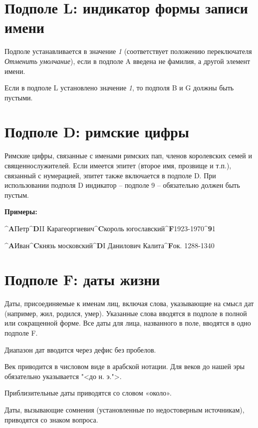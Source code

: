 \section{Подполе L: индикатор формы записи имени}

Подполе устанавливается в значение \emph{1} (соответствует положению переключателя \emph{Отменить умолчание}), если в подполе A введена не фамилия, а другой элемент имени.

Если в подполе L установлено значение \emph{1}, то подполя B и G должны быть пустыми.

\section{Подполе D: римские цифры}

Римские цифры, связанные с именами римских пап, членов королевских семей и священнослужителей. Если имеется эпитет (второе имя, прозвище и т.п.), связанный с нумерацией, эпитет также включается в подполе D. При использовании подполя D индикатор -- подполе 9 -- обязательно должен быть пустым.

\textbf{Примеры:}

\begin{cutelist}
    \item \textbf{\^{}A}Петр\textbf{\^{}D}II Карагеоргиевич\textbf{\^{}C}король югославский\textbf{\^{}F}1923-1970\textbf{\^{}9}1
    \item \textbf{\^{}A}Иван\textbf{\^{}C}князь московский\textbf{\^{}D}I Данилович Калита\textbf{\^{}F}ок. 1288-1340
\end{cutelist}

\section{Подполе F: даты жизни}

Даты, присоединяемые к именам лиц, включая слова, указывающие на смысл дат (например, жил, родился, умер). Указанные слова вводятся в подполе в полной или сокращенной форме. Все даты для лица, названного в поле, вводятся в одно подполе F.

Диапазон дат вводится через дефис без пробелов.

Век приводится в числовом виде в арабской нотации. Для веков до нашей эры обязательно указывается "<до н. э.">.

Приблизительные даты приводятся со словом «около».

Даты, вызывающие сомнения (установленные по недостоверным источникам), приводятся со знаком вопроса.

